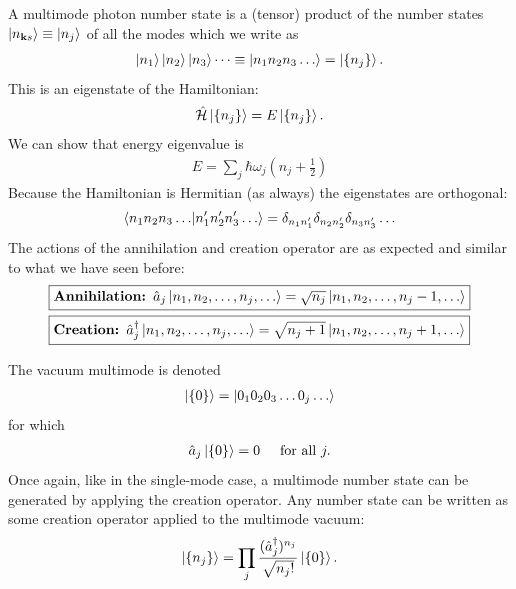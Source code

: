 \documentclass{book}
\theoremstyle{definition}
\newcommand{\ham}{\mathcal{H}}
\newcommand{\f}[2]{\frac{#1}{#2}}
\newcommand{\lp}{\left(}
\newcommand{\rp}{\right)}
\begin{document}
A multimode photon number state is a (tensor) product of the number states $\ket{n_{\mathbf{k}s}} \equiv \ket{n_j}$ of all the modes which we write as
\begin{align}
\ket{n_1}\ket{n_2}\ket{n_3}\dots \equiv \ket{n_1n_2n_3\dots} = \ket{\{ n_j \}}.
\end{align}
This is an eigenstate of the Hamiltonian:
\begin{align}
\hat{\ham}\ket{\{ n_j \}} = E\ket{\{ n_j \}}.
\end{align}
We can show that energy eigenvalue is
\begin{align}
\boxed{E = \sum_j \hbar\omega_j \lp n_j + \f{1}{2} \rp}
\end{align}
Because the Hamiltonian is Hermitian (as always) the eigenstates are orthogonal:
\begin{align}
\bra{n_1n_2n_3\dots}\ket{n'_1n'_2n'_3\dots} = \delta_{n_1n'_1}\delta_{n_2n'_2}\delta_{n_3n'_3}\dots
\end{align}
The actions of the annihilation and creation operator are as expected and similar to what we have seen before:
\begin{align}
&\boxed{\textbf{Annihilation: } \hat{a}_j \ket{n_1,n_2,\dots,n_j,\dots} = \sqrt{n_j}\ket{n_1,n_2,\dots,n_j - 1,\dots}}\\
&\boxed{\textbf{Creation: } \hat{a}^\dagger_j \ket{n_1,n_2,\dots,n_j,\dots} = \sqrt{n_j + 1}\ket{n_1,n_2,\dots,n_j + 1,\dots}}
\end{align}


The vacuum multimode is denoted
\begin{align}
\ket{\{ 0 \}} = \ket{0_10_20_3\dots 0_j\dots}
\end{align}
for which
\begin{align}
\hat{a}_j \ket{\{ 0 \}} = 0 \hspace{0.5cm} \text{for all }j.
\end{align}
Once again, like in the single-mode case, a multimode number state can be generated by applying the creation operator. Any number state can be written as some creation operator applied to the multimode vacuum:
\begin{align}
\ket{\{ n_j \}} = \prod_{j} \f{(\hat{a}^\dagger_{j})^{n_j}}{\sqrt{n_j !}}\ket{\{ 0 \}}.
\end{align}
\end{document}
